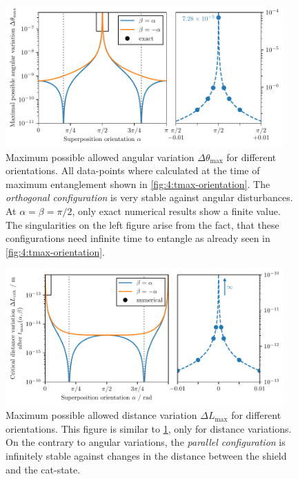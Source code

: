 \begin{figure}[!htbp]
  \centering
  \includegraphics[width=0.95\textwidth]{./../figures/theta-variance/theta-max-orientation-complete.pdf}
  \caption{Maximum possible allowed angular variation $\Delta\theta_\mathrm{max}$ for different orientations. All data-points where calculated at the time of maximum entanglement shown in \cref{fig:4:tmax-orientation}. The \emph{orthogonal configuration} is very stable against angular disturbances. At $\alpha=\beta=\pi/2$, only exact numerical results show a finite value. The singularities on the left figure arise from the fact, that these configurations need infinite time to entangle as already seen in \cref{fig:4:tmax-orientation}.}
  \label{fig:4:theta-max-orientation}
\end{figure}

\begin{figure}[!htbp]
  \centering
  \includegraphics[width=0.95\textwidth]{./../figures/L-variance/L-max-orientation-complete.pdf}
  \caption{Maximum possible allowed distance variation $\Delta L_\mathrm{max}$ for different orientations. This figure is similar to \cref{fig:4:theta-max-orientation}, only for distance variations. On the contrary to angular variations, the \emph{parallel configuration} is infinitely stable against changes in the distance between the shield and the cat-state.}
  \label{fig:4:L-max-orientation}
\end{figure}

